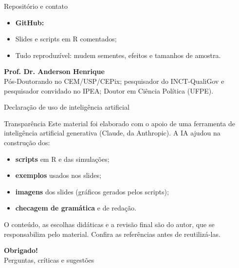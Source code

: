 \begin{frame}{Repositório e contato}
  \begin{itemize}
    \item \textbf{GitHub:} 
    \item Slides e scripts em R comentados;
    \item Tudo reproduzível: mudem sementes, efeitos e tamanhos de amostra.
  \end{itemize}
  \vspace{0.1cm}
  \textbf{Prof. Dr. Anderson Henrique}\\
  {\small Pós-Doutorando no CEM/USP/CEPix; pesquisador do INCT-QualiGov e pesquisador convidado no IPEA; Doutor em Ciência Política (UFPE).\\
  }
\end{frame}

\begin{frame}{Declaração de uso de inteligência artificial}
  \begin{block}{Transparência}
    Este material foi elaborado com o apoio de uma ferramenta de inteligência artificial generativa (Claude, da Anthropic). A IA ajudou na construção dos:
    \begin{itemize}
      \item \textbf{scripts} em R e das simulações;
      \item \textbf{exemplos} usados nos slides;
      \item \textbf{imagens} dos slides (gráficos gerados pelos scripts);
      \item \textbf{checagem de gramática} e de redação.
    \end{itemize}
  \end{block}
  \footnotesize O conteúdo, as escolhas didáticas e a revisão final são do autor, que se responsabiliza pelo material. Confira as referências antes de reutilizá-las.
\end{frame}

\begin{frame}
  \centering\vspace{1.2cm}
  {\Huge\bfseries\color{azul} Obrigado!}\\[0.5cm]
  {\large Perguntas, críticas e sugestões}
\end{frame}
